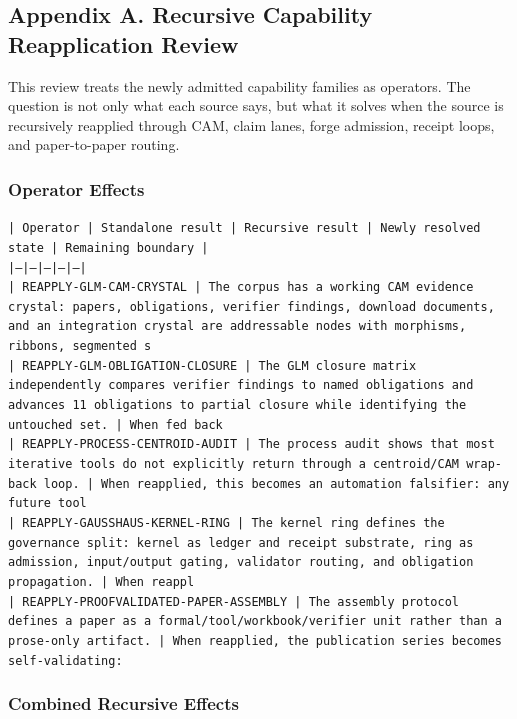 \documentclass[11pt]{article}
\begin{document}
\subsection*{Appendix A. Recursive Capability Reapplication Review}

This review treats the newly admitted capability families as operators. The question is not only what each source says, but what it solves when the source is recursively reapplied through CAM, claim lanes, forge admission, receipt loops, and paper-to-paper routing.

\subsubsection*{Operator Effects}

\noindent\texttt{| Operator | Standalone result | Recursive result | Newly resolved state | Remaining boundary |}\\
\noindent\texttt{|---|---|---|---|---|}\\
\noindent\texttt{| REAPPLY-GLM-CAM-CRYSTAL | The corpus has a working CAM evidence crystal: papers, obligations, verifier findings, download documents, and an integration crystal are addressable nodes with morphisms, ribbons, segmented s}\\
\noindent\texttt{| REAPPLY-GLM-OBLIGATION-CLOSURE | The GLM closure matrix independently compares verifier findings to named obligations and advances 11 obligations to partial closure while identifying the untouched set. | When fed back }\\
\noindent\texttt{| REAPPLY-PROCESS-CENTROID-AUDIT | The process audit shows that most iterative tools do not explicitly return through a centroid/CAM wrap-back loop. | When reapplied, this becomes an automation falsifier: any future tool}\\
\noindent\texttt{| REAPPLY-GAUSSHAUS-KERNEL-RING | The kernel ring defines the governance split: kernel as ledger and receipt substrate, ring as admission, input/output gating, validator routing, and obligation propagation. | When reappl}\\
\noindent\texttt{| REAPPLY-PROOFVALIDATED-PAPER-ASSEMBLY | The assembly protocol defines a paper as a formal/tool/workbook/verifier unit rather than a prose-only artifact. | When reapplied, the publication series becomes self-validating:}\\

\subsubsection*{Combined Recursive Effects}
\end{document}
